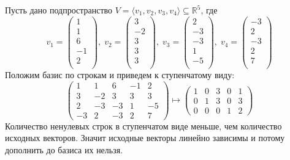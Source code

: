 \documentclass{article}
\begin{document}
Пусть дано подпространство $V = \langle v_1, v_2, v_3, v_4\rangle\subseteq \mathbb R^5$, где
\[
v_{{1}} = \begin{pmatrix}
{1}\\
{1}\\
{6}\\
{-1}\\
{2}\\
\end{pmatrix},\;v_{{2}} = \begin{pmatrix}
{3}\\
{-2}\\
{3}\\
{3}\\
{3}\\
\end{pmatrix},\;v_{{3}} = \begin{pmatrix}
{2}\\
{-3}\\
{-3}\\
{1}\\
{-5}\\
\end{pmatrix},\;v_{{4}} = \begin{pmatrix}
{-3}\\
{2}\\
{-3}\\
{2}\\
{7}\\
\end{pmatrix}
\]
Положим базис по строкам и приведем к ступенчатому виду:
\[
\begin{pmatrix}
1&1&6&-1&2\\
3&-2&3&3&3\\
2&-3&-3&1&-5\\
-3&2&-3&2&7
\end{pmatrix}
\mapsto
\begin{pmatrix}
1&0&3&0&1\\
0&1&3&0&3\\
0&0&0&1&2
\end{pmatrix}
\]
Количество ненулевых строк в ступенчатом виде меньше, чем количество исходных векторов.
Значит исходные векторы линейно зависимы и потому дополнить до базиса их нельзя.
\end{document}
